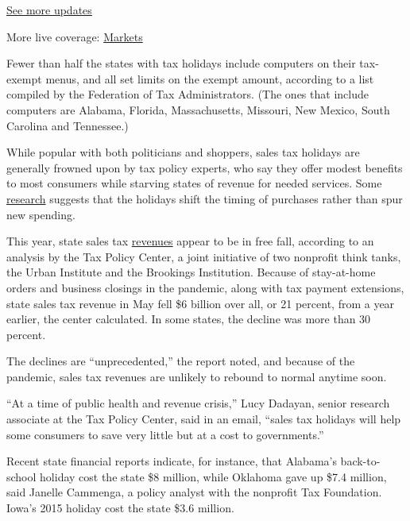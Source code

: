\href{https://www.nytimes3xbfgragh.onion/2020/08/01/world/coronavirus-covid-19.html?action=click\&pgtype=Article\&state=default\&region=MAIN_CONTENT_1\&context=storylines_live_updates}{See
more updates}

More live coverage:
\href{https://www.nytimes3xbfgragh.onion/live/2020/07/31/business/stock-market-today-coronavirus?action=click\&pgtype=Article\&state=default\&region=MAIN_CONTENT_1\&context=storylines_live_updates}{Markets}

Fewer than half the states with tax holidays include computers on their
tax-exempt menus, and all set limits on the exempt amount, according to
a list compiled by the Federation of Tax Administrators. (The ones that
include computers are Alabama, Florida, Massachusetts, Missouri, New
Mexico, South Carolina and Tennessee.)

While popular with both politicians and shoppers, sales tax holidays are
generally frowned upon by tax policy experts, who say they offer modest
benefits to most consumers while starving states of revenue for needed
services. Some
\href{https://www.federalreserve.gov/econres/notes/feds-notes/effect-of-sales-tax-holidays-on-consumer-spending-20170324.htm}{research}
suggests that the holidays shift the timing of purchases rather than
spur new spending.

This year, state sales tax
\href{https://www.taxpolicycenter.org/taxvox/covid-19-effect-state-sales-tax-receipts-shrank-6-billion-may}{revenues}
appear to be in free fall, according to an analysis by the Tax Policy
Center, a joint initiative of two nonprofit think tanks, the Urban
Institute and the Brookings Institution. Because of stay-at-home orders
and business closings in the pandemic, along with tax payment
extensions, state sales tax revenue in May fell \$6 billion over all, or
21 percent, from a year earlier, the center calculated. In some states,
the decline was more than 30 percent.

The declines are ``unprecedented,'' the report noted, and because of the
pandemic, sales tax revenues are unlikely to rebound to normal anytime
soon.

``At a time of public health and revenue crisis,'' Lucy Dadayan, senior
research associate at the Tax Policy Center, said in an email, ``sales
tax holidays will help some consumers to save very little but at a cost
to governments.''

Recent state financial reports indicate, for instance, that Alabama's
back-to-school holiday cost the state \$8 million, while Oklahoma gave
up \$7.4 million, said Janelle Cammenga, a policy analyst with the
nonprofit Tax Foundation. Iowa's 2015 holiday cost the state \$3.6
million.

